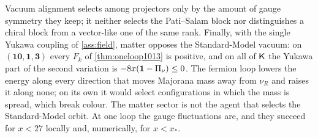 Vacuum alignment \cite{Peskin80,Preskill81} selects among projectors only by the amount of gauge symmetry they keep; it neither selects the Pati--Salam block nor
distinguishes a chiral block from a vector-like one of the same rank. Finally, with the single Yukawa coupling of \cref{ass:field}, matter opposes the
Standard-Model vacuum: on $(\mathbf{10},\mathbf1,\mathbf3)$ every $F_k$
of \cref{thm:oneloop1013} is positive, and on all of $\mathsf K$ the Yukawa part of the second variation is $-8x(\mathbf 1-\Pi_\nu)\le0$. The fermion loop lowers the energy
along every direction that moves Majorana mass away from $\nu_R$ and raises it along none; on its own it would select configurations in which the mass is
spread, which break colour. The matter sector is not the agent that selects the Standard-Model orbit. At one loop the gauge fluctuations are, and they succeed
for $x<27$ locally and, numerically, for $x<x_*$.
